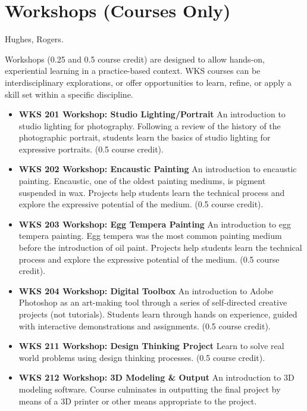 \documentclass[
  letterpaper,
]{scrbook}
\providecommand{\tightlist}{%
  \setlength{\itemsep}{0pt}\setlength{\parskip}{0pt}}
\begin{document}
\hypertarget{workshops-courses-only}{%
\section{Workshops (Courses Only)}\label{workshops-courses-only}}

Hughes, Rogers.

Workshops (0.25 and 0.5 course credit) are designed to allow hands-on,
experiential learning in a practice-based context. WKS courses can be
interdisciplinary explorations, or offer opportunities to learn, refine,
or apply a skill set within a specific discipline.

\begin{itemize}
\tightlist
\item
  \textbf{WKS 201 Workshop: Studio Lighting/Portrait} An introduction to
  studio lighting for photography. Following a review of the history of
  the photographic portrait, students learn the basics of studio
  lighting for expressive portraits. (0.5 course credit).\\
\item
  \textbf{WKS 202 Workshop: Encaustic Painting} An introduction to
  encaustic painting. Encaustic, one of the oldest painting mediums, is
  pigment suspended in wax. Projects help students learn the technical
  process and explore the expressive potential of the medium. (0.5
  course credit).
\item
  \textbf{WKS 203 Workshop: Egg Tempera Painting} An introduction to egg
  tempera painting. Egg tempera was the most common painting medium
  before the introduction of oil paint. Projects help students learn the
  technical process and explore the expressive potential of the medium.
  (0.5 course credit).\\
\item
  \textbf{WKS 204 Workshop: Digital Toolbox} An introduction to Adobe
  Photoshop as an art-making tool through a series of self-directed
  creative projects (not tutorials). Students learn through hands on
  experience, guided with interactive demonstrations and assignments.
  (0.5 course credit).
\item
  \textbf{WKS 211 Workshop: Design Thinking Project} Learn to solve real
  world problems using design thinking processes. (0.5 course credit).\\
\item
  \textbf{WKS 212 Workshop: 3D Modeling \& Output} An introduction to 3D
  modeling software. Course culminates in outputting the final project
  by means of a 3D printer or other means appropriate to the project.

\end{itemize}
\end{document}
